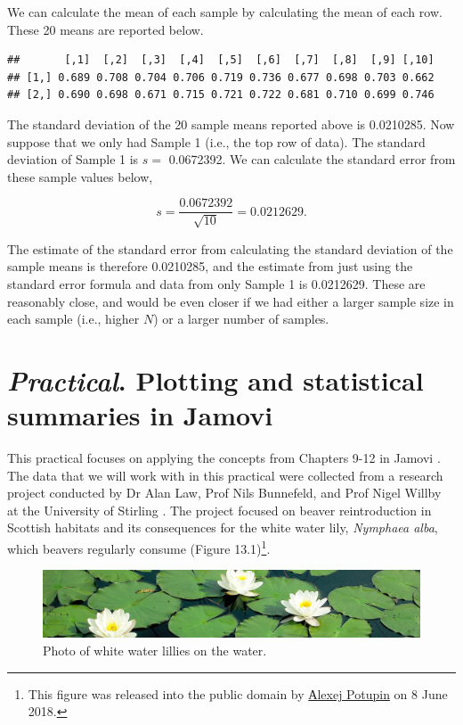 \documentclass[
]{scrbook}
\begin{document}
We can calculate the mean of each sample by calculating the mean of each row.
These 20 means are reported below.

\begin{verbatim}
##       [,1]  [,2]  [,3]  [,4]  [,5]  [,6]  [,7]  [,8]  [,9] [,10]
## [1,] 0.689 0.708 0.704 0.706 0.719 0.736 0.677 0.698 0.703 0.662
## [2,] 0.690 0.698 0.671 0.715 0.721 0.722 0.681 0.710 0.699 0.746
\end{verbatim}

The standard deviation of the 20 sample means reported above is 0.0210285.
Now suppose that we only had Sample 1 (i.e., the top row of data).
The standard deviation of Sample 1 is \(s =\) 0.0672392.
We can calculate the standard error from these sample values below,

\[s = \frac{0.0672392}{\sqrt{10}} = 0.0212629.\]

The estimate of the standard error from calculating the standard deviation of the sample means is therefore 0.0210285, and the estimate from just using the standard error formula and data from only Sample 1 is 0.0212629.
These are reasonably close, and would be even closer if we had either a larger sample size in each sample (i.e., higher \(N\)) or a larger number of samples.

\hypertarget{Chapter_13}{%
\chapter{\texorpdfstring{\emph{Practical}. Plotting and statistical summaries in Jamovi}{Practical. Plotting and statistical summaries in Jamovi}}\label{Chapter_13}}

This practical focuses on applying the concepts from Chapters 9-12 in Jamovi \citep{Jamovi2022}.
The data that we will work with in this practical were collected from a research project conducted by Dr Alan Law, Prof Nils Bunnefeld, and Prof Nigel Willby at the University of Stirling \citep{Law2014}.
The project focused on beaver reintroduction in Scottish habitats and its consequences for the white water lily, \emph{Nymphaea alba}, which beavers regularly consume (Figure 13.1)\footnote{This figure was released into the public domain by \href{https://commons.wikimedia.org/wiki/File:Nymphaea_alba._Reader.jpg}{Аlexej Potupin} on 8 June 2018.}.

\begin{figure}
\includegraphics[width=1\linewidth]{img/Nymphaea_alba_pads} \caption{Photo of white water lillies on the water.}\label{fig:unnamed-chunk-46}
\end{figure}
\end{document}
